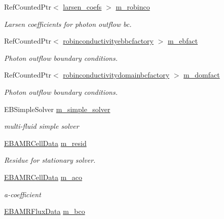 \begin{DoxyCompactItemize}
Ref\+Counted\+Ptr$<$ \hyperlink{classlarsen__coefs}{larsen\+\_\+coefs} $>$ \hyperlink{classeddington__sp1_ae38005aa62215a621122de6426fe2fa2}{m\+\_\+robinco}
\begin{DoxyCompactList}\small\item\em Larsen coefficients for photon outflow bc. \end{DoxyCompactList}\item 
Ref\+Counted\+Ptr$<$ \hyperlink{classrobinconductivityebbcfactory}{robinconductivityebbcfactory} $>$ \hyperlink{classeddington__sp1_aec9daf4f816814f77eed4f38b5756bd2}{m\+\_\+ebfact}
\begin{DoxyCompactList}\small\item\em Photon outflow boundary conditions. \end{DoxyCompactList}\item 
Ref\+Counted\+Ptr$<$ \hyperlink{classrobinconductivitydomainbcfactory}{robinconductivitydomainbcfactory} $>$ \hyperlink{classeddington__sp1_a898b7acb563e655a43514256dd6a2cce}{m\+\_\+domfact}
\begin{DoxyCompactList}\small\item\em Photon outflow boundary conditions. \end{DoxyCompactList}\item 
E\+B\+Simple\+Solver \hyperlink{classeddington__sp1_ae96063dbad675db6e801b1f60b7daa6f}{m\+\_\+simple\+\_\+solver}
\begin{DoxyCompactList}\small\item\em multi-\/fluid simple solver \end{DoxyCompactList}\item 
\hyperlink{type__definitions_8H_a7e610f301989e5e07781c5e338bdb7c3}{E\+B\+A\+M\+R\+Cell\+Data} \hyperlink{classeddington__sp1_a73f58ed4df70505d9153f7a364459018}{m\+\_\+resid}
\begin{DoxyCompactList}\small\item\em Residue for stationary solver. \end{DoxyCompactList}\item 
\hyperlink{type__definitions_8H_a7e610f301989e5e07781c5e338bdb7c3}{E\+B\+A\+M\+R\+Cell\+Data} \hyperlink{classeddington__sp1_ae6993f6535e80266677384cd1d290927}{m\+\_\+aco}
\begin{DoxyCompactList}\small\item\em a-\/coefficient \end{DoxyCompactList}\item 
\hyperlink{type__definitions_8H_aadad278b2e5d3d4abcf9032f90ba78c3}{E\+B\+A\+M\+R\+Flux\+Data} \hyperlink{classeddington__sp1_a53bdb3ad07165ca354cbb7078cdb30a5}{m\+\_\+bco}

\end{DoxyCompactItemize}
